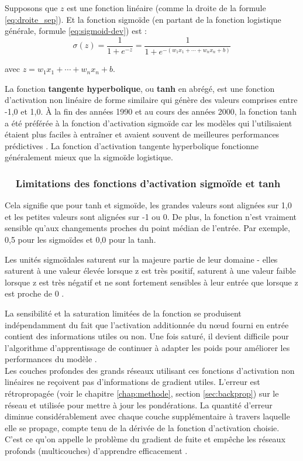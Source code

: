 	
	Supposons que $z$ est une fonction linéaire (comme la droite de la formule \ref{eq:droite_sep}). Et la fonction sigmoïde (en partant de la fonction logistique générale, formule \ref{eq:sigmoid-dev}) est :
	\begin{equation}\label{eq:sigmoid-activation}
	{\displaystyle \sigma (z)= {\frac {1}{1+e^{-z}}} ={\frac {1}{1+e^{-(w _{1}x_{1}+\cdots +w_{n}x_{n}+b)}}}}
	\end{equation} 
	
	avec $z = w _{1}x_{1}+\cdots +w_{n}x_{n}+b$.
	
	
	La fonction \textbf{tangente hyperbolique}, ou \textbf{tanh} en abrégé, est une fonction d'activation non linéaire de forme similaire qui génère des valeurs comprises entre -1,0 et 1,0. À la fin des années 1990 et au cours des années 2000, la fonction tanh a été préférée à la fonction d'activation sigmoïde car les modèles qui l'utilisaient étaient plus faciles à entraîner et avaient souvent de meilleures performances prédictives \cite{goodfellow2016deep}.
	La fonction d'activation tangente hyperbolique fonctionne généralement mieux que la sigmoïde logistique.
	
	\subsubsection*{\qquad \textbullet \ \ Limitations des fonctions d'activation sigmoïde et tanh}
	Cela signifie que pour tanh et sigmoïde, les grandes valeurs sont alignées sur 1,0 et les petites valeurs sont alignées sur -1 ou 0. De plus, la fonction n'est vraiment sensible qu'aux changements proches du point médian de l'entrée. Par exemple, 0,5 pour les sigmoïdes et 0,0 pour la tanh.
	
	Les unités sigmoïdales saturent sur la majeure partie de leur domaine - elles saturent à une valeur élevée lorsque z est très positif, saturent à une valeur faible lorsque z est très négatif et ne sont fortement sensibles à leur entrée que lorsque z est proche de 0 \cite{ml2008python}.
	
	La sensibilité et la saturation limitées de la fonction se produisent indépendamment du fait que l'activation additionnée du nœud fourni en entrée contient des informations utiles ou non. Une fois saturé, il devient difficile pour l'algorithme d'apprentissage de continuer à adapter les poids pour améliorer les performances du modèle \cite{goodfellow2016deep}.\\
	Les couches profondes des grands réseaux utilisant ces fonctions d'activation non linéaires ne reçoivent pas d'informations de gradient utiles. L'erreur est rétropropagée (voir le chapitre \ref{chap:methode}, section \ref{sec:backprop}) sur le réseau et utilisée pour mettre à jour les pondérations. La quantité d'erreur diminue considérablement avec chaque couche supplémentaire à travers laquelle elle se propage, compte tenu de la dérivée de la fonction d'activation choisie. C'est ce qu'on appelle le problème du gradient de fuite et empêche les réseaux profonds (multicouches) d'apprendre efficacement \cite{geron2017hands}.
	

